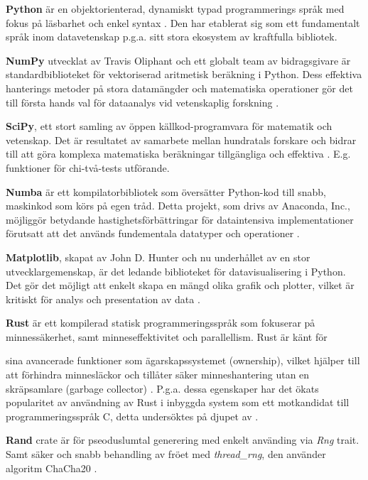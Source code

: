 \documentclass[swedish,a4paper]{article}
\begin{document}
\textbf{Python} är en objektorienterad, dynamiskt typad programmerings
språk med fokus på läsbarhet och enkel syntax \parencite{python}. Den
har etablerat sig som ett fundamentalt språk inom datavetenskap p.g.a. sitt
stora ekosystem av kraftfulla \gls{bibliotek}. 

\textbf{NumPy} utvecklat av Travis Oliphant och ett globalt team av
bidragsgivare är standardbiblioteket för vektoriserad aritmetisk beräkning i
Python. Dess effektiva hanterings metoder på stora datamängder och matematiska
operationer gör det till första hands val för dataanalys vid vetenskaplig
forskning \parencite{numpy}.

\textbf{SciPy}, ett stort samling av öppen källkod-programvara för matematik och
vetenskap. Det är resultatet av samarbete mellan hundratals forskare och bidrar
till att göra komplexa matematiska beräkningar tillgängliga och effektiva
\parencite{scipy}. E.g. funktioner för chi-två-tests utförande.

\textbf{Numba} är ett kompilatorbibliotek som översätter Python-kod till snabb,
maskinkod som körs på egen tråd. Detta projekt, som drivs av Anaconda, Inc.,
möjliggör betydande hastighetsförbättringar för dataintensiva implementationer 
förutsatt att det används fundementala datatyper och operationer \parencite{numba}.  

\textbf{Matplotlib}, skapat av John D. Hunter och nu underhållet av en stor
utvecklargemenskap, är det ledande biblioteket för datavisualisering i Python.
Det gör det möjligt att enkelt skapa en mängd olika grafik och plotter, vilket
är kritiskt för analys och presentation av data \textcite{matplotlib}.

\textbf{Rust} är ett kompilerad statisk programmeringsspråk som fokuserar på
minnessäkerhet, samt minneseffektivitet och parallellism. Rust är känt för

sina avancerade funktioner som ägarskapssystemet (ownership), vilket
hjälper till att förhindra minnesläckor och tillåter säker
minneshantering utan en skräpsamlare (garbage collector)
\parencite{rust}. 
P.g.a. dessa egenskaper har det ökats popularitet av användning av Rust i
inbyggda system som ett motkandidat till programmeringsspråk C, detta  undersöktes
 på djupet av \textcite{sharma2023rust}.

\textbf{Rand} \gls{crate} är för pseoduslumtal generering med enkelt använding
via \textit{Rng} trait. Samt säker och snabb behandling av fröet med
\textit{thread\_rng}, den använder algoritm ChaCha20 \parencite{rand_crate}.
\end{document}
